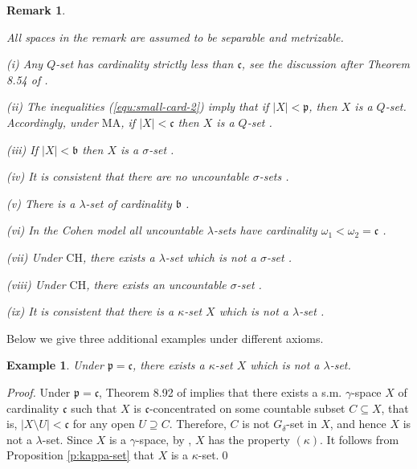 \documentclass[preprint,11pt]{elsarticle}
\newtheorem{remark}[theorem]{Remark}
\newtheorem{example}[theorem]{Example}
\numberwithin{equation}{section}
\numberwithin{theorem}{section}
\def\om{\omega}
\def\sm/{{s.m.}}
\begin{document}
\begin{remark}\label{rem:small-sms} {\em
All spaces in the remark are assumed to be separable and metrizable.
\smallskip

(i) Any $Q$-set has cardinality strictly less than $\mathfrak{c}$, see the discussion after Theorem 8.54 of \cite[p.~314]{Bukovsky2011}.
\smallskip

(ii) The inequalities (\ref{equ:small-card-2}) imply that if $|X|<\mathfrak{p}$, then $X$ is a $Q$-set. Accordingly, under $\mathrm{MA}$, if $|X|<\mathfrak{c}$ then $X$ is a $Q$-set \cite[Theorem 4.2]{Miller}.
\smallskip

(iii) If $|X|<\mathfrak{b}$ then $X$ is a $\sigma$-set \cite[Theorem 9.1]{vD}.
\smallskip

(iv) It is consistent that there are no uncountable $\sigma$-sets \cite[Theorem 22]{Miller1979}.
\smallskip

(v) There is a  $\lambda$-set of cardinality $\mathfrak{b}$ \cite[Theorem 9.1]{vD}.
\smallskip

(vi) In the Cohen model all uncountable $\lambda$-sets have cardinality $\om_1<\om_2=\mathfrak{c}$ \cite[Theorem 22]{Miller1991}.
\smallskip

(vii) Under $\mathrm{CH}$, there exists  a  $\lambda$-set  which is not a $\sigma$-set \cite[\S~40,~Theorem~VI.3]{Kuratowski}.
\smallskip

(viii) Under $\mathrm{CH}$, there exists an uncountable $\sigma$-set \cite[Theorem 5.7]{Miller}.
\smallskip

(ix)
It is consistent that there is a $\kappa$-set $X$ which is not a $\lambda$-set \cite[Example 4.9]{Osipov-251}.}
\end{remark}

Below we give three additional examples under different axioms.

\begin{example}\label{exa:gamma-neq-kappa}
Under $\mathfrak{p}=\mathfrak{c}$, there exists a $\kappa$-set $X$ which is not a $\lambda$-set.
\end{example}

\begin{proof}
Under $\mathfrak{p}=\mathfrak{c}$, Theorem 8.92 of \cite{Bukovsky2011} implies that there exists a \sm/ $\gamma$-space $X$ of cardinality $\mathfrak{c}$ such that $X$ is $\mathfrak{c}$-concentrated on some countable subset $C\subseteq X$, that is, $|X\setminus U|<\mathfrak{c}$ for any open $U\supseteq C$. Therefore, $C$ is not $G_\delta$-set in $X$, and hence $X$ is not a $\lambda$-set. Since $X$ is a $\gamma$-space, by  \cite[Theorem 3.2]{Sak2},  $X$ has the property $(\kappa)$. It follows from Proposition \ref{p:kappa-set} that $X$ is a $\kappa$-set.\qed
\end{proof}
\end{document}
